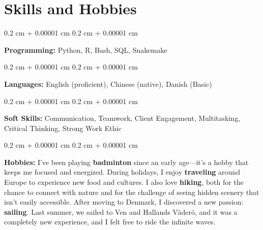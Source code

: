 \documentclass[10pt, letterpaper]{article}
\newenvironment{onecolentry}{
    \begin{adjustwidth}{
        0.2 cm + 0.00001 cm
    }{
        0.2 cm + 0.00001 cm
    }
}{
    \end{adjustwidth}
} %
\begin{document}
    \section{Skills and Hobbies}

        \begin{onecolentry}
            \textbf{Programming:} Python, R, Bash, SQL, Snakemake
        \end{onecolentry}

        \vspace{0.2 cm}

        \begin{onecolentry}
            \textbf{Languages:} English (proficient), Chinese (native), Danish (Basic)
        \end{onecolentry}

        \vspace{0.2 cm}

        \begin{onecolentry}
            \textbf{Soft Skills:} Communication, Teamwork, Client Engagement, Multitasking, Critical Thinking, Strong Work Ethic
        \end{onecolentry}

        \vspace{0.2 cm}

        \begin{onecolentry}
            \textbf{Hobbies:} 
            I’ve been playing \textbf{badminton} since an early age—it’s a hobby that keeps me focused and energized. During holidays, I enjoy \textbf{traveling} around Europe to experience new food and cultures. I also love \textbf{hiking}, both for the chance to connect with nature and for the challenge of seeing hidden scenery that isn’t easily accessible. After moving to Denmark, I discovered a new passion: \textbf{sailing}. Last summer, we sailed to Ven and Hallands Väderö, and it was a completely new experience, and I felt free to ride the infinite waves.
        \end{onecolentry}


    
\end{document}
